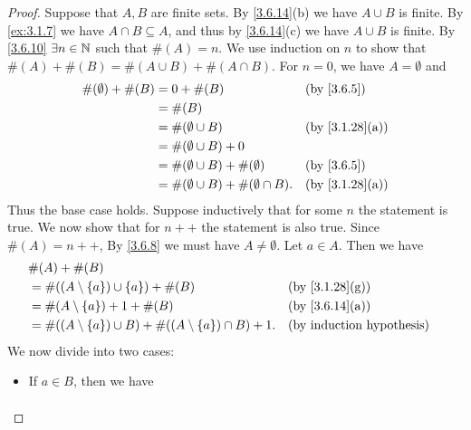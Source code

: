 \begin{proof}
  Suppose that \(A, B\) are finite sets.
  By \cref{3.6.14}(b) we have \(A \cup B\) is finite.
  By \cref{ex:3.1.7} we have \(A \cap B \subseteq A\), and thus by \cref{3.6.14}(c) we have \(A \cup B\) is finite.
  By \cref{3.6.10} \(\exists n \in \mathbb{N}\) such that \(\#(A) = n\).
  We use induction on \(n\) to show that \(\#(A) + \#(B) = \#(A \cup B) + \#(A \cap B)\).
  For \(n = 0\), we have \(A = \emptyset\) and
  \begin{align*}
    \#(\emptyset) + \#(B) & = 0 + \#(B)                                    &  & \by{3.6.5}                   \\
                          & = \#(B)                                                                          \\
                          & = \#(\emptyset \cup B)                         &  & \text{(by \cref{3.1.28}(a))} \\
                          & = \#(\emptyset \cup B) + 0                                                       \\
                          & = \#(\emptyset \cup B) + \#(\emptyset)         &  & \by{3.6.5}                   \\
                          & = \#(\emptyset \cup B) + \#(\emptyset \cap B). &  & \text{(by \cref{3.1.28}(a))}
  \end{align*}
  Thus the base case holds.
  Suppose inductively that for some \(n\) the statement is true.
  We now show that for \(n++\) the statement is also true.
  Since \(\#(A) = n++\), By \cref{3.6.8} we must have \(A \neq \emptyset\).
  Let \(a \in A\).
  Then we have
  \begin{align*}
     & \#(A) + \#(B)                                                                                                \\
     & = \#((A \setminus \set{a}) \cup \set{a}) + \#(B)                           &  & \text{(by \cref{3.1.28}(g))} \\
     & = \#(A \setminus \set{a}) + 1 + \#(B)                                      &  & \text{(by \cref{3.6.14}(a))} \\
     & = \#((A \setminus \set{a}) \cup B) + \#((A \setminus \set{a}) \cap B) + 1. &  & \byIH
  \end{align*}
  We now divide into two cases:
  \begin{itemize}
    \item If \(a \in B\), then we have
          \begin{align*}

\end{align*}
\end{itemize}
\end{proof}
